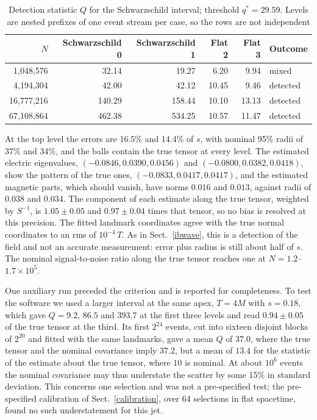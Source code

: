 \documentclass[11pt,a4paper]{article}
\begin{document}
\begin{table}[t]
\centering\small
\caption{Detection statistic $Q$ for the Schwarzschild interval; threshold
$q^*=29.59$. Levels are nested prefixes of one event stream per case, so
the rows are not independent}
\label{schwtable}
\begin{tabular}{rrrrrl}
\toprule
$N$ & Schwarzschild 0 & Schwarzschild 1 & Flat 2 & Flat 3 & Outcome\\
\midrule
1,048,576 & 32.14 & 19.27 & 6.20 & 9.94 & mixed\\
4,194,304 & 42.00 & 42.12 & 10.45 & 9.46 & detected\\
16,777,216 & 140.29 & 158.44 & 10.10 & 13.13 & detected\\
67,108,864 & 462.38 & 534.25 & 10.57 & 11.47 & detected\\
\bottomrule
\end{tabular}
\end{table}

At the top level the errors are 16.5\% and 14.4\% of $s$, with
nominal 95\% radii of 37\% and 34\%, and the balls contain the
true tensor at every level. The estimated electric eigenvalues,
$(-0.0846,0.0390,0.0456)$ and $(-0.0800,0.0382,0.0418)$, show the pattern
of the true ones, $(-0.0833,0.0417,0.0417)$, and the estimated magnetic
parts, which should vanish, have norms $0.016$ and $0.013$, against radii
of $0.038$ and $0.034$. The component of each estimate along the true
tensor, weighted by $S^{-1}$, is $1.05\pm0.05$ and $0.97\pm0.04$ times that
tensor, so no bias is resolved at this precision. The fitted landmark
coordinates agree with the true normal coordinates to an rms of
$10^{-4}\,T$. As in Sect.~\ref{ibwave}, this is a detection of the field
and not an accurate measurement: error plus radius is still about half of
$s$. The nominal signal-to-noise ratio along the true tensor reaches one at
$N=1.2$--$1.7\times10^5$.

One auxiliary run preceded the criterion and is reported for completeness.
To test the software we used a larger interval at the same apex, $T=4M$
with $s=0.18$, which gave $Q=9.2$, $86.5$ and $393.7$ at the first three
levels and read $0.94\pm0.05$ of the true tensor at the third. Its first
$2^{24}$ events, cut into sixteen disjoint blocks of $2^{20}$ and fitted
with the same landmarks, gave a mean $Q$ of $37.0$, where the true tensor
and the nominal covariance imply $37.2$, but a mean of $13.4$ for the
statistic of the estimate about the true tensor, where $10$ is nominal.
At about $10^6$ events the nominal covariance may thus understate the
scatter by some 15\% in standard deviation. This concerns one selection and
was not a pre-specified test; the pre-specified calibration of
Sect.~\ref{calibration}, over 64 selections in flat spacetime, found no such
understatement for this jet.
\end{document}
